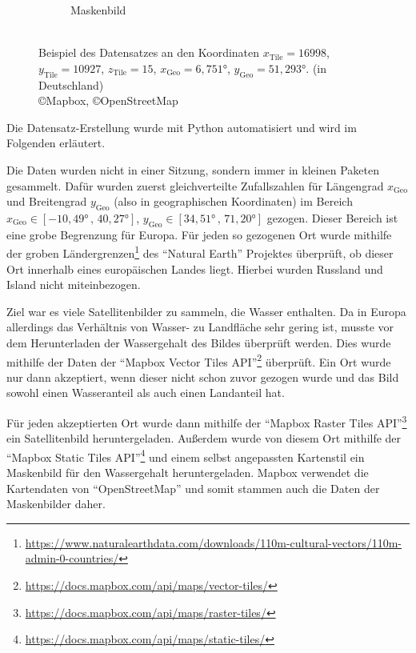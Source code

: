 \begin{figure}
\begin{subfigure}{0.3\textwidth}
        \caption{Maskenbild}
        \label{fig:datensatz_beispiel_maske.png}
    \end{subfigure}
    \caption{\\Beispiel des Datensatzes an den Koordinaten %
            ${x_\text{Tile} = 16998}$, ${y_\text{Tile} = 10927}$, ${z_\text{Tile} = 15}$, %
            ${x_\text{Geo} = 6,751°}$, ${y_\text{Geo} = 51,293°}$. %
            (in Deutschland) \\ \copyright Mapbox, \copyright OpenStreetMap}
    \label{fig:datensatz_beispiel}
\end{figure}

Die Datensatz-Erstellung wurde mit Python automatisiert und wird im Folgenden erläutert.

Die Daten wurden nicht in einer Sitzung, sondern immer in kleinen Paketen gesammelt.
Dafür wurden zuerst gleichverteilte Zufallszahlen für Längengrad $x_\text{Geo}$ und Breitengrad $y_\text{Geo}$ (also in geographischen Koordinaten) 
im Bereich ${x_\text{Geo} \in [-10,49° \,,\, 40,27°]}$, ${y_\text{Geo} \in [34,51° \,,\, 71,20°]}$ gezogen.
Dieser Bereich ist eine grobe Begrenzung für Europa.
Für jeden so gezogenen Ort wurde mithilfe der groben Ländergrenzen\footnote{\url{https://www.naturalearthdata.com/downloads/110m-cultural-vectors/110m-admin-0-countries/}} des \enquote{Natural Earth} Projektes überprüft, 
ob dieser Ort innerhalb eines europäischen Landes liegt. \cite{natural_earth}
Hierbei wurden Russland und Island nicht miteinbezogen.

Ziel war es viele Satellitenbilder zu sammeln, die Wasser enthalten.
Da in Europa allerdings das Verhältnis von Wasser- zu Landfläche sehr gering ist, musste vor dem Herunterladen der Wassergehalt des Bildes überprüft werden.
Dies wurde mithilfe der Daten der \enquote{Mapbox Vector Tiles API}\footnote{\url{https://docs.mapbox.com/api/maps/vector-tiles/}} überprüft. \cite{mapbox}
Ein Ort wurde nur dann akzeptiert, wenn dieser nicht schon zuvor gezogen wurde und das Bild sowohl einen Wasseranteil als auch einen Landanteil hat.

Für jeden akzeptierten Ort wurde dann mithilfe der \enquote{Mapbox Raster Tiles API}\footnote{\url{https://docs.mapbox.com/api/maps/raster-tiles/}} ein Satellitenbild heruntergeladen.
Außerdem wurde von diesem Ort mithilfe der \enquote{Mapbox Static Tiles API}\footnote{\url{https://docs.mapbox.com/api/maps/static-tiles/}} und einem selbst angepassten Kartenstil ein Maskenbild für den Wassergehalt heruntergeladen.\cite{mapbox}
Mapbox verwendet die Kartendaten von \enquote{OpenStreetMap} und somit stammen auch die Daten der Maskenbilder daher.\cite{OpenStreetMap}


